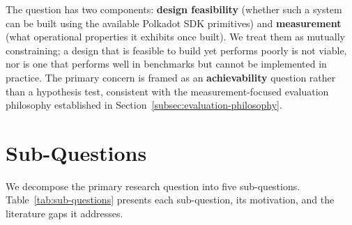 The question has two components: \textbf{design feasibility} (whether such a system can be built using the available Polkadot SDK primitives) and \textbf{measurement} (what operational properties it exhibits once built). We treat them as mutually constraining; a design that is feasible to build yet performs poorly is not viable, nor is one that performs well in benchmarks but cannot be implemented in practice. The primary concern is framed as an \textbf{achievability} question rather than a hypothesis test, consistent with the measurement-focused evaluation philosophy established in Section~\ref{subsec:evaluation-philosophy}.

\section{Sub-Questions}\label{sec:sub-questions}

We decompose the primary research question into five sub-questions. Table~\ref{tab:sub-questions} presents each sub-question, its motivation, and the literature gaps it addresses.

